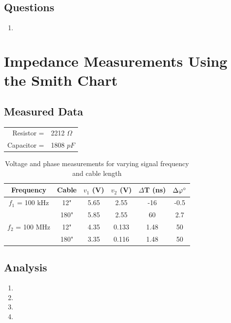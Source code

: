 \documentclass{article}
\begin{document}
\subsection{Questions}
\begin{enumerate}
	\item
\end{enumerate}
\section{Impedance Measurements Using the Smith Chart}
\subsection{Measured Data}
\begin{table}[h]
\centering
	\begin{tabular}{rl}
	Resistor =   & 2212 $\Omega$  \\
	Capacitor =  & 1808 $pF$      
	\end{tabular}
\end{table}

\begin{table}[H]
\centering
	\begin{tabular}{|c|c|c|c|c|c|}
	\hline
	\textbf{Frequency} & \textbf{Cable} & $v_1$ (V) & $v_2$ (V) & $\Delta$T (ns) & $\Delta\varphi\degree$ \\ \hline
	$f_{1}$ = 100 kHz  & 12"                & 5.65   & 2.55   & -16     & -0.5      \\ \hline
	                   & 180"               & 5.85   & 2.55   & 60      & 2.7       \\ \hline
	$f_{2}$ = 100 MHz  & 12"                & 4.35   & 0.133  & 1.48    & 50        \\ \hline
	                   & 180"               & 3.35   & 0.116  & 1.48    & 50        \\ \hline
	\end{tabular}
	\caption{Voltage and phase measurements for varying signal frequency and cable length}
	\label{Data 1}
\end{table}
\subsection{Analysis}
\begin{enumerate}
	\item
	\item
	\item
	\item
\end{enumerate}
\end{document}
